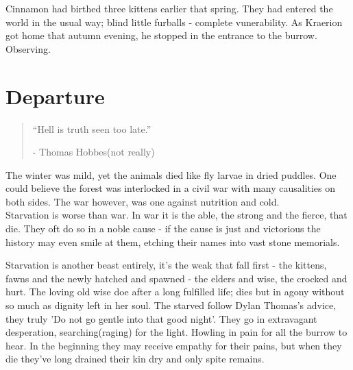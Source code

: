 \documentclass[smalldemyvopaper,11pt,twoside,onecolumn,openright,extrafontsizes]{memoir}
\begin{document}
Cinnamon had birthed three kittens earlier that spring. They had entered the world in the usual way; blind little furballs - complete vunerability. As Kraerion got home that autumn evening, he stopped in the entrance to the burrow. Observing. 

\chapter{Departure}

\vspace{-1.3cm}
\begin{localsize}{10}
	\begin{quote}
		
	
	“Hell is truth seen too late.”
	\begin{flushright}- Thomas Hobbes(not really) \end{flushright}
	\end{quote} 
\end{localsize}
\vspace{1cm}


The winter was mild, yet the animals died like fly larvae in dried puddles. One could believe the forest was interlocked in a civil war with many causalities on both sides. The war however, was one against nutrition and cold. \\

Starvation is worse than war. In war it is the able, the strong and the fierce, that die. They oft do so in a noble cause - if the cause is just and victorious the history may even smile at them, etching their names into vast stone memorials. 

Starvation is another beast entirely, it's the weak that fall first - the kittens, fawns and the newly hatched and spawned - the elders and wise, the crocked and hurt. The loving old wise doe after a long fulfilled life; dies but in agony without so much as dignity left in her soul. The starved follow Dylan Thomas's advice, they truly 'Do not go gentle into that good night'. They go in extravagant desperation, searching(raging) for the light. Howling in pain for all the burrow to hear. In the beginning they may receive empathy for their pains, but when they die they've long drained their kin dry and only spite remains.\\
\end{document}
